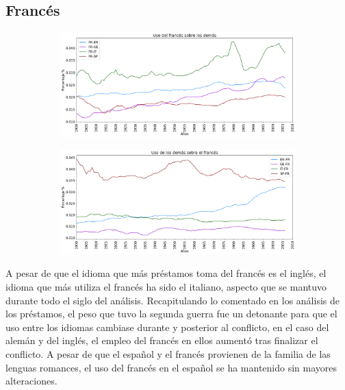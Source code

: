 \subsection{Francés}

\begin{figure}[h!]
	
	\begin{subfigure}{}
		\centering
		\includegraphics[scale=.38]{Cap_4/PF1_S2_FR.png}
		\caption{}
		\label{fig:ST_FR_a}
	\end{subfigure}
	
	\begin{subfigure}{}
		\centering
		\includegraphics[scale=.38]{Cap_4/PF2_S2_FR.png}
		\caption{}
		\label{fig:ST_FR_b}
	\end{subfigure}
	
\end{figure}

A pesar de que el idioma que más préstamos toma del francés es el inglés,  el idioma que más utiliza el francés ha sido el italiano,  aspecto que se mantuvo durante todo el siglo del análisis.  Recapitulando lo comentado en los análisis de los préstamos,  el peso que tuvo la segunda guerra fue un detonante para que el uso entre los idiomas cambiase durante y posterior al conflicto,  en el caso del alemán y del inglés,  el empleo del francés en ellos aumentó tras finalizar el conflicto.  A pesar de que el español y el francés provienen de la familia de las lenguas romances,  el uso del francés en el español se ha mantenido sin mayores alteraciones.

